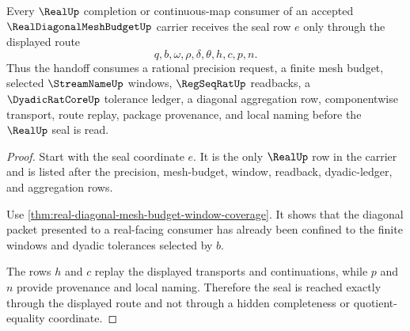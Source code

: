 \begin{theorem}
\label{thm:real-diagonal-mesh-budget-realup-handoff}
Every $\RealUp$ completion or continuous-map consumer of an accepted $\RealDiagonalMeshBudgetUp$ carrier receives the seal row $e$ only through the displayed route
$$
q,b,\omega,\rho,\delta,\theta,h,c,p,n.
$$
Thus the handoff consumes a rational precision request, a finite mesh budget, selected $\StreamNameUp$ windows, $\RegSeqRatUp$ readbacks, a $\DyadicRatCoreUp$ tolerance ledger, a diagonal aggregation row, componentwise transport, route replay, package provenance, and local naming before the $\RealUp$ seal is read.
\end{theorem}
\begin{proof}
Start with the seal coordinate $e$. It is the only $\RealUp$ row in the carrier and is listed after the precision, mesh-budget, window, readback, dyadic-ledger, and aggregation rows.

Use \autoref{thm:real-diagonal-mesh-budget-window-coverage}. It shows that the diagonal packet presented to a real-facing consumer has already been confined to the finite windows and dyadic tolerances selected by $b$.

The rows $h$ and $c$ replay the displayed transports and continuations, while $p$ and $n$ provide provenance and local naming. Therefore the seal is reached exactly through the displayed route and not through a hidden completeness or quotient-equality coordinate.
\end{proof}

